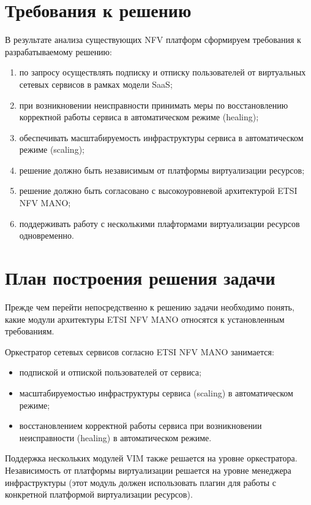 \documentclass[oneside,final,14pt,a4paper]{extreport}
\begin{document}
\section{Требования к решению}
\label{sec:platform_requirements}
В результате анализа существующих NFV платформ сформируем требования к разрабатываемому решению:
\begin{enumerate}
	\item по запросу осуществлять подписку и отписку пользователей от виртуальных сетевых сервисов в рамках модели SaaS;
	\item при возникновении неисправности принимать меры по восстановлению корректной работы сервиса в автоматическом режиме (healing);
	\item обеспечивать масштабируемость инфраструктуры сервиса в автоматическом режиме (scaling);
	\item решение должно быть независимым от платформы виртуализации ресурсов;
	\item решение должно быть согласовано с высокоуровневой архитектурой ETSI NFV MANO;
	\item поддерживать работу с несколькими плафтормами виртуализации ресурсов одновременно.
\end{enumerate}


\section{План построения решения задачи}
Прежде чем перейти непосредственно к решению задачи необходимо понять, какие модули архитектуры ETSI NFV MANO относятся к установленным требованиям.

Оркестратор сетевых сервисов согласно ETSI NFV MANO занимается:
\begin{itemize}
	\item подпиской и отпиской пользователей от сервиса;
	\item масштабируемостью инфраструктуры сервиса (scaling) в автоматическом режиме;
	\item восстановлением корректной работы сервиса при возникновении неисправности (healing) в автоматическом режиме.
\end{itemize}

Поддержка нескольких модулей VIM также решается на уровне оркестратора. Независимость от платформы виртуализации решается на уровне менеджера инфраструктуры (этот модуль должен использовать плагин для работы с конкретной платформой виртуализации ресурсов).
\end{document}
